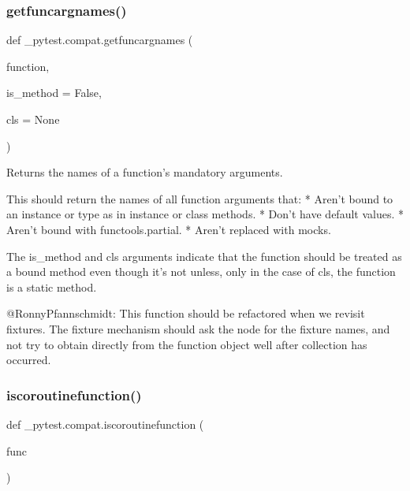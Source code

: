 \subsubsection{\texorpdfstring{getfuncargnames()}{getfuncargnames()}}
{\footnotesize\ttfamily def \+\_\+pytest.\+compat.\+getfuncargnames (\begin{DoxyParamCaption}\item[{}]{function,  }\item[{}]{is\+\_\+method = {\ttfamily False},  }\item[{}]{cls = {\ttfamily None} }\end{DoxyParamCaption})}

\begin{DoxyVerb}Returns the names of a function's mandatory arguments.

This should return the names of all function arguments that:
    * Aren't bound to an instance or type as in instance or class methods.
    * Don't have default values.
    * Aren't bound with functools.partial.
    * Aren't replaced with mocks.

The is_method and cls arguments indicate that the function should
be treated as a bound method even though it's not unless, only in
the case of cls, the function is a static method.

@RonnyPfannschmidt: This function should be refactored when we
revisit fixtures. The fixture mechanism should ask the node for
the fixture names, and not try to obtain directly from the
function object well after collection has occurred.\end{DoxyVerb}
 \mbox{\label{namespace__pytest_1_1compat_ad5b3e6b075044794e72742004fd980f6}} 
\subsubsection{\texorpdfstring{iscoroutinefunction()}{iscoroutinefunction()}}
{\footnotesize\ttfamily def \+\_\+pytest.\+compat.\+iscoroutinefunction (\begin{DoxyParamCaption}\item[{}]{func }\end{DoxyParamCaption})}

 \mbox{\label{namespace__pytest_1_1compat_af488d4507f9eca6c852d942058186efe}} 
